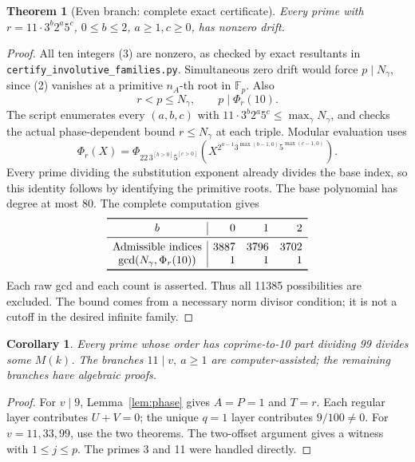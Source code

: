 \documentclass[10pt]{article}
\newtheorem{theorem}{Theorem}
\newtheorem{corollary}{Corollary}
\begin{document}
\begin{theorem}[Even branch: complete exact certificate]
Every prime with \(r=11\cdot3^b2^a5^c\), \(0\le b\le2\),
\(a\ge1,c\ge0\), has nonzero drift.
\end{theorem}
\begin{proof}
All ten integers (3) are nonzero, as checked by exact resultants in
\texttt{certify\_involutive\_families.py}. Simultaneous zero drift would
force \(p\mid N_\gamma\), since (2) vanishes at a primitive
\(n_A\)-th root in \(\mathbb F_p\). Also
\[
r<p\le N_\gamma,\qquad p\mid\Phi_r(10).
\]
The script enumerates every \((a,b,c)\) with
\(11\cdot3^b2^a5^c\le\max_\gamma N_\gamma\), and checks the actual
phase-dependent bound \(r\le N_\gamma\) at each triple. Modular evaluation uses
\[
\Phi_r(X)=\Phi_{22\,3^{[b>0]}5^{[c>0]}}
 \left(X^{2^{a-1}3^{\max(b-1,0)}5^{\max(c-1,0)}}\right).
\]
Every prime dividing the substitution exponent already divides the base
index, so this identity follows by identifying the primitive roots.
The base polynomial has degree at most 80. The complete computation gives
\[
\begin{array}{c|rrr}\toprule
b&0&1&2\\\midrule
\text{Admissible indices}&3887&3796&3702\\
\gcd(N_\gamma,\Phi_r(10))&1&1&1\\\bottomrule
\end{array}
\]
Each raw gcd and each count is asserted. Thus all 11385 possibilities
are excluded. The bound comes from a necessary norm divisor condition;
it is not a cutoff in the desired infinite family.
\end{proof}

\begin{corollary}
Every prime whose order has coprime-to-10 part dividing 99 divides some
\(M(k)\). The branches \(11\mid v,\ a\ge1\) are computer-assisted;
the remaining branches have algebraic proofs.
\end{corollary}
\begin{proof}
For \(v\mid9\), Lemma~\ref{lem:phase} gives \(A=P=1\) and \(T=r\).
Each regular layer contributes \(U+V=0\); the unique \(q=1\) layer
contributes \(9/100\ne0\). For \(v=11,33,99\), use the two theorems.
The two-offset argument gives a witness with \(1\le j\le p\).
The primes 3 and 11 were handled directly.
\end{proof}
\end{document}
